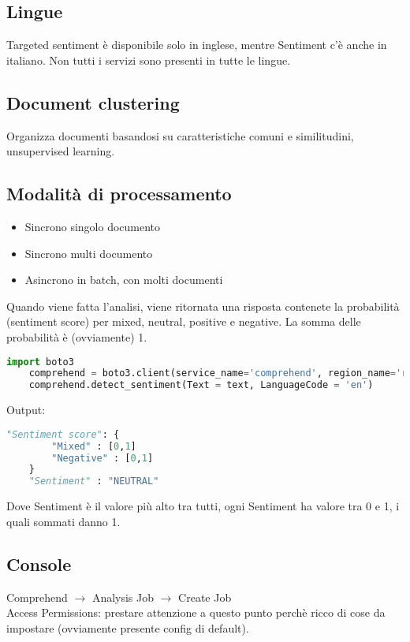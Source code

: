 \documentclass{classes/base}
\begin{document}
    \subsection*{Lingue}
    Targeted sentiment è disponibile solo in inglese, mentre Sentiment c'è anche in italiano. 
    Non tutti i servizi sono presenti in tutte le lingue.

    \subsection*{Document clustering}
    Organizza documenti basandosi su caratteristiche comuni e similitudini, unsupervised learning.

    \subsection*{Modalità di processamento}
    \begin{itemize}
        \item Sincrono singolo documento
        \item Sincrono multi documento
        \item Asincrono in batch, con molti documenti
    \end{itemize}
    Quando viene fatta l'analisi, viene ritornata una risposta contenete la probabilità (sentiment score) per mixed, neutral, positive e negative. 
    La somma delle probabilità è (ovviamente) 1. \\
    \begin{lstlisting}[language=Python]
    import boto3
    comprehend = boto3.client(service_name='comprehend', region_name='region')
    comprehend.detect_sentiment(Text = text, LanguageCode = 'en')
    \end{lstlisting}
    Output:
    \begin{lstlisting}[language=Python]
    "Sentiment score": {
        "Mixed" : [0,1]
        "Negative" : [0,1]
    }
    "Sentiment" : "NEUTRAL"
    \end{lstlisting}
    Dove Sentiment è il valore più alto tra tutti, ogni Sentiment ha valore tra 0 e 1, i quali sommati danno 1.\\
    
    \subsection*{Console}
    Comprehend $\rightarrow$ Analysis Job $\rightarrow$ Create Job \\
    Access Permissions: prestare attenzione a questo punto perchè ricco di cose da impostare (ovviamente presente config di default).
\end{document}
